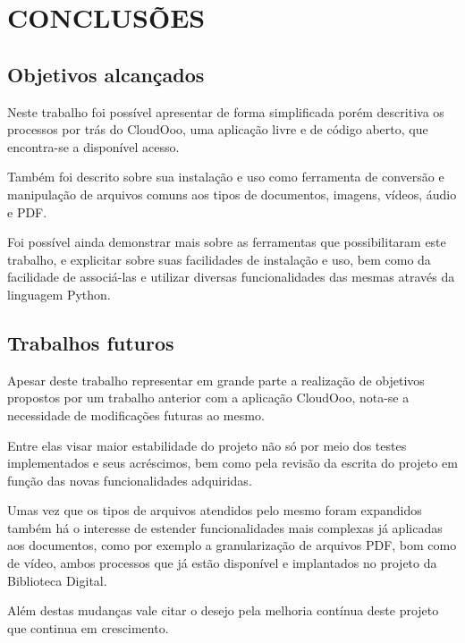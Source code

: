 \chapter{CONCLUSÕES}

\section{Objetivos alcançados}

Neste trabalho foi possível apresentar de forma simplificada porém descritiva os processos por trás do CloudOoo, uma aplicação livre e de código aberto, que encontra-se a disponível acesso.

Também foi descrito sobre sua instalação e uso como ferramenta de conversão e manipulação de arquivos comuns aos tipos de documentos, imagens, vídeos, áudio e PDF.

Foi possível ainda demonstrar mais sobre as ferramentas que possibilitaram este trabalho, e explicitar sobre suas facilidades de instalação e uso, bem como da facilidade de associá-las e utilizar diversas funcionalidades das mesmas através da linguagem Python.

\section{Trabalhos futuros}

Apesar deste trabalho representar em grande parte a realização de objetivos propostos por um trabalho anterior com a aplicação CloudOoo, nota-se a necessidade de modificações futuras ao mesmo.

Entre elas visar maior estabilidade do projeto não só por meio dos testes implementados e seus acréscimos, bem como pela revisão da escrita do projeto em função das novas funcionalidades adquiridas.

Umas vez que os tipos de arquivos atendidos pelo mesmo foram expandidos também há o interesse de estender funcionalidades mais complexas já aplicadas aos documentos, como por exemplo a granularização de arquivos PDF, bom como de vídeo, ambos processos que já estão disponível e implantados no projeto da Biblioteca Digital.

Além destas mudanças vale citar o desejo pela melhoria contínua deste projeto que continua em crescimento.
